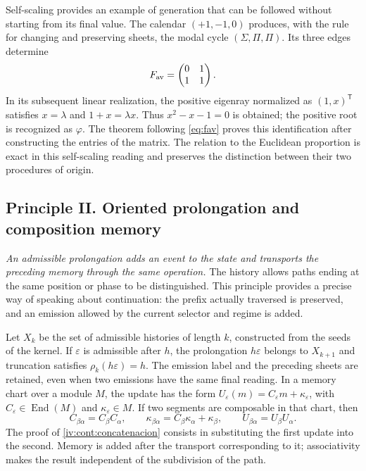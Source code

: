 Self-scaling provides an example of generation that can be followed without starting
from its final value. The calendar \((+1,-1,0)\) produces, with the rule for
changing and preserving sheets, the modal cycle
\((\Sigma,\Pi,\Pi)\). Its three edges determine
\[
 F_{\rm av}=\begin{pmatrix}0&1\\1&1\end{pmatrix}.
\]
In its subsequent linear realization, the positive eigenray normalized
as \((1,x)^{\mathsf T}\) satisfies \(x=\lambda\) and
\(1+x=\lambda x\). Thus \(x^2-x-1=0\) is obtained; the positive root is
recognized as \(\varphi\). The theorem following \eqref{eq:fav} proves
this identification after constructing the entries of the matrix.
The relation to the Euclidean proportion is exact in this self-scaling
reading and preserves the distinction between their two procedures of origin.

\subsection*{Principle II. Oriented prolongation and composition memory}
\hypertarget{prinh:prolongacion}{}

\emph{An admissible prolongation adds an event to the state and
transports the preceding memory through the same operation.} The history
allows paths ending at the same position or phase to be
distinguished. This principle provides a precise way of speaking about
continuation: the prefix actually traversed is preserved, and an
emission allowed by the current selector and regime is added.

Let \(X_k\) be the set of admissible histories of length \(k\),
constructed from the seeds of the kernel. If \(\varepsilon\) is admissible
after \(h\), the prolongation \(h\varepsilon\) belongs to \(X_{k+1}\)
and truncation satisfies \(\rho_k(h\varepsilon)=h\). The
emission label and the preceding sheets are retained, even when two emissions
have the same final reading. In a memory chart over a module
\(M\), the update has the form
\(U_\varepsilon(m)=C_\varepsilon m+\kappa_\varepsilon\), with
\(C_\varepsilon\in\operatorname{End}(M)\) and
\(\kappa_\varepsilon\in M\). If two segments are composable in that
chart, then
\[
 C_{\beta\alpha}=C_\beta C_\alpha,\qquad
 \kappa_{\beta\alpha}=C_\beta\kappa_\alpha+\kappa_\beta,
 \qquad U_{\beta\alpha}=U_\beta U_\alpha.
\]
The proof of \cref{iv:cont:concatenacion} consists in substituting the first
update into the second. Memory is added after the transport
corresponding to it; associativity makes the result independent of the
subdivision of the path.

